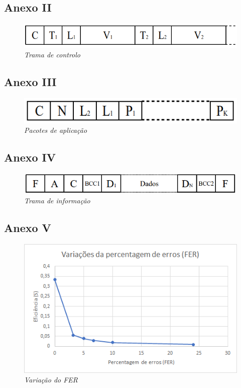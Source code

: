 \documentclass[article, a4paper, 11pt, oneside]{memoir}
\begin{document}
\newpage
\subsection{Anexo II}
\begin{figure}[h]
	\centering
\includegraphics[scale=0.55]{trama-2.png}
\caption{\emph{Trama de controlo}}
\end{figure}

\subsection{Anexo III}
\begin{figure}[h]
	\centering
\includegraphics[scale=0.7]{trama-1.png}
\caption{\emph{Pacotes de aplicação}}
\end{figure}

\subsection{Anexo IV}
\begin{figure}[h]
	\centering
\includegraphics[scale=0.55]{trama-3.png}
\caption{\emph{Trama de informação}}
\end{figure}


\newpage
\subsection{Anexo V}
\begin{figure}[h]
	\centering
\includegraphics[scale=0.7]{fer.png}
\caption{\emph{Variação do FER}}
\end{figure}
\end{document}
